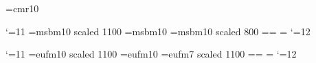 



\document
{}
\font\tenrm=cmr10

\catcode`\@=11
\font\twelvemsb=msbm10 scaled 1100
\font\tenmsb=msbm10
\font\ninemsb=msbm10 scaled 800
\newfam\msbfam
\textfont\msbfam=\twelvemsb  \scriptfont\msbfam=\ninemsb
  \scriptscriptfont\msbfam=\ninemsb
\def\msb@{\hexnumber@\msbfam}
\def\Bbb{\relax\ifmmode\let\next\Bbb@\else
 \def\next{\errmessage{Use \string\Bbb\space only in math
mode}}\fi\next}
\def\Bbb@#1{{\Bbb@@{#1}}}
\def\Bbb@@#1{\fam\msbfam#1}
\catcode`\@=12

 \catcode`\@=11
\font\twelveeuf=eufm10 scaled 1100
\font\teneuf=eufm10
\font\nineeuf=eufm7 scaled 1100%
\newfam\euffam
\textfont\euffam=\twelveeuf  \scriptfont\euffam=\teneuf
  \scriptscriptfont\euffam=\nineeuf
\def\euf@{\hexnumber@\euffam}
\def\frak{\relax\ifmmode\let\next\frak@\else
 \def\next{\errmessage{Use \string\frak\space only in math
mode}}\fi\next}
\def\frak@#1{{\frak@@{#1}}}
\def\frak@@#1{\fam\euffam#1}
\catcode`\@=12


 \def\famzero{\rm }
\def\arccos{\mathop{\famzero arccos}\nolimits}
\def\arcsin{\mathop{\famzero arcsin}\nolimits}
\def\arctan{\mathop{\famzero arctan}\nolimits}
\def\arg{\mathop{\famzero arg}\nolimits}
\def\cos{\mathop{\famzero cos}\nolimits}
\def\cosh{\mathop{\famzero cosh}\nolimits}
\def\cot{\mathop{\famzero cot}\nolimits}
\def\coth{\mathop{\famzero coth}\nolimits}
\def\csc{\mathop{\famzero csc}\nolimits}
\def\deg{\mathop{\famzero deg}\nolimits}
\def\det{\mathop{\famzero det}}
\def\dim{\mathop{\famzero dim}\nolimits}
\def\exp{\mathop{\famzero exp}\nolimits}
\def\gcd{\mathop{\famzero gcd}}
\def\hom{\mathop{\famzero hom}\nolimits}
\def\inf{\mathop{\famzero inf}}
\def\ker{\mathop{\famzero ker}\nolimits}
\def\lg{\mathop{\famzero lg}\nolimits}
\def\ln{\mathop{\famzero ln}\nolimits}
\def\log{\mathop{\famzero log}\nolimits}
\def\max{\mathop{\famzero max}}
\def\min{\mathop{\famzero min}}
\def\Pr{\mathop{\famzero Pr}}
\def\sec{\mathop{\famzero sec}\nolimits}
\def\sin{\mathop{\famzero sin}\nolimits}
\def\sinh{\mathop{\famzero sinh}\nolimits}
\def\sup{\mathop{\famzero sup}}
\def\tan{\mathop{\famzero tan}\nolimits}
\def\tanh{\mathop{\famzero tanh}\nolimits}

